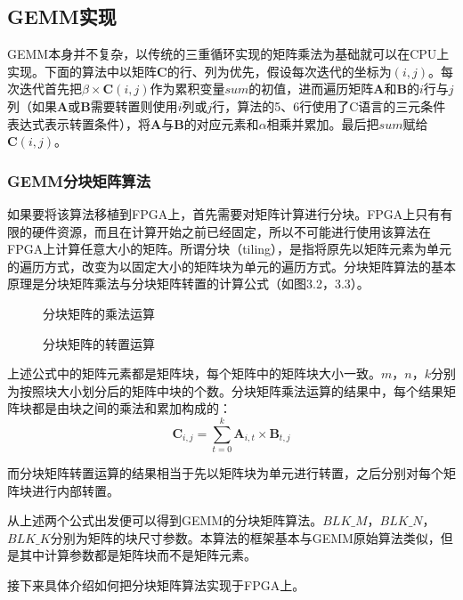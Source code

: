 \subsection{GEMM实现}

GEMM本身并不复杂，以传统的三重循环实现的矩阵乘法为基础就可以在CPU上实现。下面的算法中以矩阵$\mathbf{C}$的行、列为优先，假设每次迭代的坐标为$(i,j)$。每次迭代首先把$\beta \times \mathbf{C}(i,j)$作为累积变量$sum$的初值，进而遍历矩阵$\mathbf{A}$和$\mathbf{B}$的$i$行与$j$列（如果$\mathbf{A}$或$\mathbf{B}$需要转置则使用$i$列或$j$行，算法的5、6行使用了C语言的三元条件表达式表示转置条件），将$\mathbf{A}$与$\mathbf{B}$的对应元素和$\alpha$相乘并累加。最后把$sum$赋给$\mathbf{C}(i,j)$。



\subsubsection{GEMM分块矩阵算法}
如果要将该算法移植到FPGA上，首先需要对矩阵计算进行分块。FPGA上只有有限的硬件资源，而且在计算开始之前已经固定，所以不可能进行使用该算法在FPGA上计算任意大小的矩阵。所谓分块（tiling），是指将原先以矩阵元素为单元的遍历方式，改变为以固定大小的矩阵块为单元的遍历方式。分块矩阵算法的基本原理是分块矩阵乘法与分块矩阵转置的计算公式（如图3.2，3.3）。

\begin{figure}[!ht]

\caption{分块矩阵的乘法运算}
\end{figure}
\begin{figure}[!ht]

\caption{分块矩阵的转置运算}
\end{figure}

上述公式中的矩阵元素都是矩阵块，每个矩阵中的矩阵块大小一致。$m$，$n$，$k$分别为按照块大小划分后的矩阵中块的个数。分块矩阵乘法运算的结果中，每个结果矩阵块都是由块之间的乘法和累加构成的：
$$\mathbf{C}_{i,j}=\sum_{t=0}^{k} \mathbf{A}_{i,t} \times \mathbf{B}_{t,j}$$

而分块矩阵转置运算的结果相当于先以矩阵块为单元进行转置，之后分别对每个矩阵块进行内部转置。

从上述两个公式出发便可以得到GEMM的分块矩阵算法。$BLK\_M$，$BLK\_N$，$BLK\_K$分别为矩阵的块尺寸参数。本算法的框架基本与GEMM原始算法类似，但是其中计算参数都是矩阵块而不是矩阵元素。



接下来具体介绍如何把分块矩阵算法实现于FPGA上。


